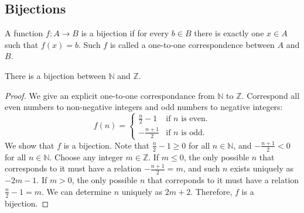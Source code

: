 \documentclass[../main.tex]{subfiles}
\begin{document}
\subsection{Bijections}
\begin{defn}
    A function $f: A \rightarrow B$ is a \textsf{bijection} if for every $b \in B$ there is exactly one $x \in A$ such that $f(x) = b$.
    Such $f$ is called a \textsf{one-to-one correspondence} between $A$ and $B$.
\end{defn}

\begin{ex} \label{ex:NZbij}
    There is a bijection between $\mathbb N$ and $\mathbb Z$.
\end{ex}
\begin{proof}
    We give an explicit one-to-one correspondance from $\mathbb{N}$ to $\mathbb Z$.
    Correspond all even numbers to non-negative integers and odd numbers to negative integers:
    \[
        f(n) = \begin{cases}
        \frac n2 - 1 &\text{if $n$ is even.}\\
    - \frac{n + 1}{2} &\text{if $n$ is odd.}
\end{cases}
    \]
    We show that $f$ is a bijection.
    Note that $\frac n2 - 1 \geq 0$ for all $n \in \mathbb N$, and $- \frac{n+1}{2} <0$ for all $n \in \mathbb N$.
    Choose any integer $m \in \mathbb Z$.
    If $m \leq 0$, the only possible $n$ that corresponds to it must have a relation $-\frac{n+1}{2} = m$, and such $n$ exists uniquely as $-2m - 1$.
    If $m > 0$, the only possible $n$ that correponds to it must have a relation $\frac n2 - 1 = m$.
    We can determine $n$ uniquely as $2m + 2$.
    Therefore, $f$ is a bijection.
\end{proof}
\end{document}
